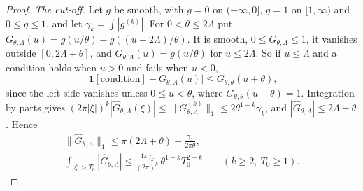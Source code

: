 \documentclass[11pt]{article}
\numberwithin{equation}{section}
\begin{document}
\begin{proof}
\emph{The cut-off.} Let $g$ be smooth, with $g = 0$ on $(-\infty, 0]$, $g = 1$ on $[1, \infty)$ and $0 \le g \le 1$, and
let $\gamma_k = \int |g^{(k)}|$. For $0 < \theta \le 2\Lambda$ put $G_{\theta, \Lambda}(u) = g(u/\theta) - g((u -
2\Lambda)/\theta)$. It is smooth, $0 \le G_{\theta, \Lambda} \le 1$, it vanishes outside $[0, 2\Lambda + \theta]$, and
$G_{\theta, \Lambda}(u) = g(u/\theta)$ for $u \le 2\Lambda$. So if $u \le \Lambda$ and a condition holds when $u > 0$
and fails when $u < 0$,
\begin{equation}\label{eq:cutoff}
  \bigl|\mathbf 1[\text{condition}] - G_{\theta, \Lambda}(u)\bigr| \le G_{\theta, \theta}(u + \theta),
\end{equation}
since the left side vanishes unless $0 \le u < \theta$, where $G_{\theta, \theta}(u + \theta) = 1$. Integration by parts
gives $(2\pi |\xi|)^k |\hat G_{\theta, \Lambda}(\xi)| \le \|G_{\theta, \Lambda}^{(k)}\|_1 \le 2\theta^{1 - k} \gamma_k$,
and $|\hat G_{\theta, \Lambda}| \le 2\Lambda + \theta$. Hence
\begin{gather*}
  \|\hat G_{\theta, \Lambda}\|_1 \le \pi(2\Lambda + \theta) + \frac{\gamma_2}{2\pi\theta}, \\
  \int_{|\xi| > T_0} |\hat G_{\theta, \Lambda}| \le \frac{4\pi \gamma_k}{(2\pi)^k} \, \theta^{1 - k} T_0^{2 - k}
  \qquad (k \ge 2,\ T_0 \ge 1).
\end{gather*}


\end{proof}
\end{document}
